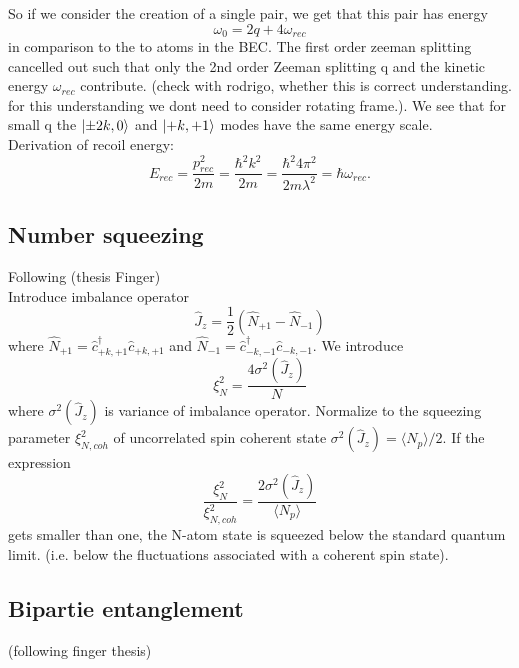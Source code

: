 So if we consider the creation of a single pair, we get that this pair has energy 
\begin{equation}
	\omega_0 = 2q + 4 \omega_{rec}
\end{equation} 
in comparison to the to atoms in the BEC. The first order zeeman splitting cancelled out such that only the 2nd order Zeeman splitting q and the kinetic energy $\omega_{rec}$ contribute. (check with rodrigo, whether this is correct understanding. for this understanding we dont need to consider rotating frame.). We see that for small q the $\ket{\pm 2k,0}$ and $\ket{+k,+1}$ modes have the same energy scale. 
\\
Derivation of recoil energy:
\begin{equation}
	E_{rec} = \frac{p_{rec}^2}{2m} = \frac{\hbar^2 k^2}{2m} = \frac{\hbar^2 4 \pi^2}{2 m \lambda^2} = \hbar \omega_{rec}.
\end{equation}
\subsection{Number squeezing}
Following (thesis Finger)
\\
Introduce imbalance operator
\begin{equation}
	\hat{J}_z = \frac{1}{2} (\hat{N}_{+1}- \hat{N}_{-1})
\end{equation}
where $\hat{N}_{+1} = \hat{c}_{+k,+1}^\dag \hat{c}_{+k,+1}$ and $\hat{N}_{-1} = \hat{c}_{-k,-1}^\dag \hat{c}_{-k,-1}$. 
We introduce 
\begin{equation}
	\xi_N^2 = \frac{4 \sigma^2(\hat{J}_z)}{N}
\end{equation}
where $\sigma^2(\hat{J}_z)$ is variance of imbalance operator. Normalize to the squeezing parameter $\xi_{N,coh}^2$ of uncorrelated spin coherent state $\sigma^2(\hat{J}_z) = \langle N_p \rangle / 2$. If the expression
\begin{equation}
	\frac{\xi_N^2}{\xi^2_{N,coh}} = \frac{2 \sigma^2(\hat{J}_z)}{\langle N_p \rangle}
\end{equation} 
gets smaller than one, the N-atom state is squeezed below the standard quantum limit. (i.e. below the fluctuations associated with a coherent spin state). 

\subsection{Bipartie entanglement} (following finger thesis)

